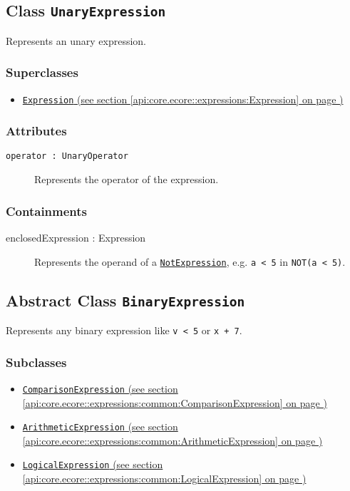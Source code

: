 \subsection{Class \texttt{UnaryExpression}}
\label{api:core.ecore::expressions:common:UnaryExpression}
Represents an unary expression.
\subsubsection*{Superclasses}
\begin{itemize}
\item \hyperref[api:core.ecore::expressions:Expression]{\texttt{Expression} (see section \ref*{api:core.ecore::expressions:Expression} on page \pageref*{api:core.ecore::expressions:Expression})}
\end{itemize}
\subsubsection*{Attributes}
\begin{description}
\item[\texttt{operator~:~UnaryOperator}] Represents the operator of the expression.
\end{description}
\subsubsection*{Containments}
\begin{description}
\item[enclosedExpression : Expression] Represents the operand of a \hyperref[NotExpression]{\texttt{NotExpression}}, e.g. \texttt{a < 5} in \texttt{NOT(a < 5)}.
\end{description}
\subsection{Abstract Class \texttt{BinaryExpression}}
\label{api:core.ecore::expressions:common:BinaryExpression}
Represents any binary expression like \texttt{v < 5} or \texttt{x + 7}.
\subsubsection*{Subclasses}
\begin{itemize}
\item \hyperref[api:core.ecore::expressions:common:ComparisonExpression]{\texttt{ComparisonExpression} (see section \ref*{api:core.ecore::expressions:common:ComparisonExpression} on page \pageref*{api:core.ecore::expressions:common:ComparisonExpression})}
\item \hyperref[api:core.ecore::expressions:common:ArithmeticExpression]{\texttt{ArithmeticExpression} (see section \ref*{api:core.ecore::expressions:common:ArithmeticExpression} on page \pageref*{api:core.ecore::expressions:common:ArithmeticExpression})}
\item \hyperref[api:core.ecore::expressions:common:LogicalExpression]{\texttt{LogicalExpression} (see section \ref*{api:core.ecore::expressions:common:LogicalExpression} on page \pageref*{api:core.ecore::expressions:common:LogicalExpression})}
\end{itemize}
